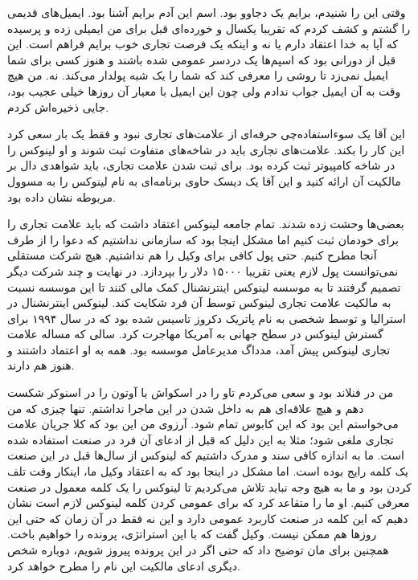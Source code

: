 وقتی این را شنیدم، برایم یک دجاوو  بود. اسم این آدم برایم آشنا بود. ایمیل‌های قدیمی را گشتم و
کشف کردم که تقریبا یکسال و خورده‌ای قبل برای من ایمیلی زده و پرسیده که
آیا به خدا اعتقاد دارم یا نه و اینکه یک فرصت تجاری خوب برایم فراهم
است. این قبل از دورانی بود که اسپم‌ها یک دردسر عمومی شده باشند و هنوز
کسی برای شما ایمیل نمی‌زد تا روشی را معرفی کند که شما را یک شبه پولدار
می‌کند. نه. من هیچ وقت به آن ایمیل جواب ندادم ولی چون این ایمیل با
معیار آن‌ روزها خیلی عجیب بود، جایی ذخیره‌اش کردم.

این آقا یک سوءاستفاده‌چی حرفه‌ای از علامت‌های تجاری نبود و فقط یک بار سعی
کرد این کار را بکند. علامت‌های تجاری باید در شاخه‌های متفاوت ثبت شوند و
او لینوکس را در شاخه کامپیوتر ثبت کرده بود. برای ثبت شدن علامت تجاری،
باید شواهدی دال بر مالکیت آن ارائه کنید و این آقا یک دیسک حاوی
برنامه‌ای به نام لینوکس را به مسوول مربوطه نشان داده بود.

بعضی‌ها وحشت زده شدند. تمام جامعه لینوکس اعتقاد داشت که باید علامت
تجاری را برای خودمان ثبت کنیم اما مشکل اینجا بود که سازمانی نداشتیم که
دعوا را از طرف آنجا مطرح کنیم. حتی پول کافی برای وکیل را هم
نداشتیم. هیچ شرکت مستقلی نمی‌توانست پول لازم یعنی تقریبا ۱۵۰۰۰ دلار را
بپردازد. در نهایت  و چند شرکت دیگر تصمیم گرفتند
تا به موسسه لینوکس اینترنشنال کمک مالی کنند تا این موسسه نسبت به
مالکیت علامت تجاری لینوکس توسط آن فرد شکایت کند. لینوکس اینترنشنال در
استرالیا و توسط شخصی به نام پاتریک دکروز
تاسیس شده بود که در سال ۱۹۹۴ برای گسترش لینوکس در سطح جهانی به آمریکا
مهاجرت کرد. سالی که مساله علامت تجاری لینوکس پیش آمد، مدداگ مدیرعامل
موسسه بود. همه به او اعتماد داشتند و هنوز هم دارند.

من در فنلاند بود و سعی می‌کردم تاو را در اسکواش یا آوتون را در اسنوکر
شکست دهم و هیچ علاقه‌ای هم به داخل شدن در این ماجرا نداشتم. تنها چیزی
که من می‌خواستم این بود که این کابوس تمام شود. آرزوی من این بود که کلا
جریان علامت تجاری ملغی شود؛ مثلا به این دلیل که قبل از ادعای آن فرد در
صنعت استفاده شده است. ما به اندازه کافی سند و مدرک داشتیم که لینوکس از
سال‌ها قبل در این صنعت یک کلمه رایج بوده است. اما مشکل در اینجا بود که
به اعتقاد وکیل ما، اینکار وقت تلف کردن بود و ما به هیچ وجه نباید تلاش
می‌کردیم تا لینوکس را یک کلمه معمول در صنعت معرفی کنیم. او ما را متقاعد
کرد که برای عمومی کردن کلمه لینوکس لازم است نشان دهیم که این کلمه در
صنعت کاربرد عمومی دارد و این نه فقط در آن زمان که حتی این روزها هم
ممکن نیست. وکیل گفت که با این استراتژی، پرونده را خواهیم باخت. همچنین
برای مان توضیح داد که حتی اگر در این پرونده پیروز شویم، دوباره شخص
دیگری ادعای مالکیت این نام را مطرح خواهد کرد.

